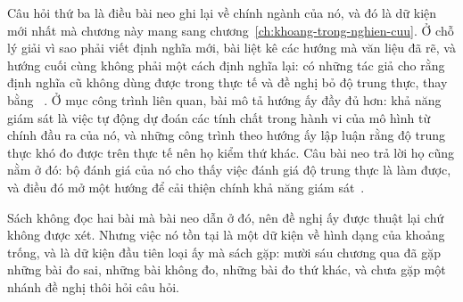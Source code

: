 %
Câu hỏi thứ ba là điều bài neo ghi lại về chính ngành của nó, và đó là dữ kiện
mới nhất mà chương này mang sang chương~\ref{ch:khoang-trong-nghien-cuu}. Ở chỗ
lý giải vì sao phải viết định nghĩa mới, bài liệt kê các hướng mà văn liệu đã rẽ,
và hướng cuối cùng không phải một cách định nghĩa lại: có những tác giả cho rằng
định nghĩa cũ không dùng được trong thực tế và đề nghị bỏ độ trung thực, thay
bằng ~\autocite{p21metrics}. Ở mục công
trình liên quan, bài mô tả hướng ấy đầy đủ hơn: khả năng giám sát là việc tự động
dự đoán các tính chất trong hành vi của mô hình từ chính đầu ra của nó, và những
công trình theo hướng ấy lập luận rằng độ trung thực khó đo được trên thực tế nên
họ kiểm thứ khác. Câu bài neo trả lời họ cũng nằm ở đó: bộ đánh giá của nó cho
thấy việc đánh giá độ trung thực là làm được, và điều đó mở một hướng để cải
thiện chính khả năng giám sát~\autocite{p21metrics}.

%
Sách không đọc hai bài mà bài neo dẫn ở đó, nên đề nghị ấy được thuật lại chứ
không được xét. Nhưng việc nó tồn tại là một dữ kiện về hình dạng của khoảng
trống, và là dữ kiện đầu tiên loại ấy mà sách gặp: mười sáu chương qua đã gặp
những bài đo sai, những bài không đo, những bài đo thứ khác, và chưa gặp một
nhánh đề nghị thôi hỏi câu hỏi.
